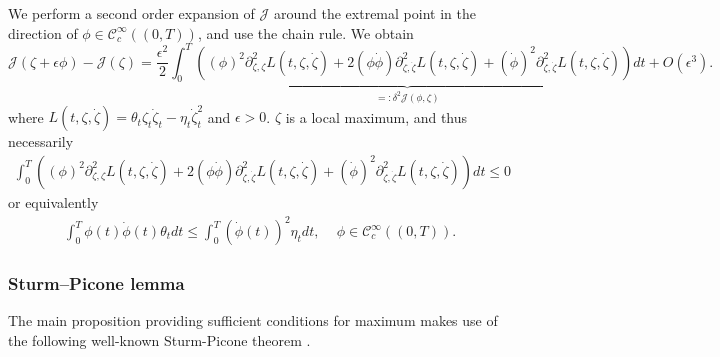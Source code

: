 \documentclass[final,3p,authoryear,12pt]{elsarticle}
\begin{document}
\label{proof:proposition:loclaminimumCalculusofVariations_proof}
We perform a second order expansion of $\mathcal{J}$ around the extremal point
in the direction of $\phi\in \mathcal{C}^{\infty}_{c}((0,T))$, and use the
chain rule. We obtain 
\begin{equation}
\label{eq:_def_od_delta_C}
\mathcal{J}(\zeta+\epsilon\phi)-\mathcal{J}(\zeta)
= \frac{\epsilon^{2}}{2}\underbrace{\int_{0}^{T}\left((\phi)^{2}\partial^{2}_{\zeta,\zeta}L(t,\zeta,\dot \zeta)+2(\phi\dot \phi)\partial^{2}_{\zeta,\dot \zeta}L(t,\zeta,\dot \zeta)+(\dot \phi)^{2}\partial^{2}_{\dot \zeta,\dot \zeta}L(t,\zeta,\dot \zeta)\right)dt}_{=:\delta^{2}\mathcal{J}(\phi,\zeta)}+O(\epsilon^{3}).
\end{equation}
where $L(t,\zeta,\dot \zeta) = \theta_t\zeta_{t}\dot \zeta_t-\eta_t\dot \zeta_t^2$ and $\epsilon>0$. $\zeta$ is a local maximum, and thus necessarily
\begin{eqnarray}\label{eq:min}     \int_{0}^{T}\left((\phi)^{2}\partial^{2}_{\zeta,\zeta}L(t,\zeta,\dot \zeta)+2(\phi\dot \phi)\partial^{2}_{\zeta,\dot \zeta}L(t,\zeta,\dot \zeta)+(\dot \phi)^{2}\partial^{2}_{\dot \zeta,\dot \zeta}L(t,\zeta,\dot \zeta)\right)dt \le 0
\end{eqnarray}
or equivalently 
\begin{eqnarray}
    \int_{0}^{T}\phi(t)\dot \phi(t)\theta_{t}dt \le \int_{0}^{T}(\dot \phi(t))^{2}\eta_{t}dt\text{,}~~~~~~\phi \in \mathcal{C}^{\infty}_{c}((0,T)).
\end{eqnarray}

\subsubsection{Sturm--Picone lemma}

The main proposition providing sufficient conditions for maximum makes use of the following well-known Sturm-Picone theorem \cite{Leetman_Sturm_Picone}.
\end{document}
